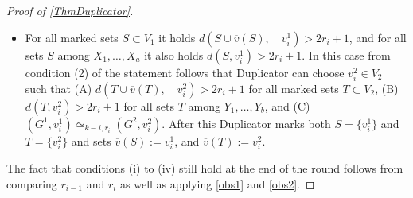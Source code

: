 \documentclass[12pt,notitlepage,a4paper]{article}
\theoremstyle{definition}
\begin{document}
\begin{proof}[Proof of \cref{ThmDuplicator}]
\begin{itemize}
\[		\quad
		N(\overline{z};3r_i+1), \overline{z}
		\, \big).		
		\]
		Then Duplicator can choose $v^2_i\in V_2$ according 
		to a winning strategy for this game. After this Duplicator
		marks both $S$ and $T$ and sets 
		$\overline{v}(S):=v^1_i$, and 
		$\overline{v}(T):=v^2_i$. Notice
		that because of \cref{lemm:Duplicator} now
		\[
		\big(G^1, (S,\overline{v}(S))\big)\simeq_{k-i,r_i}
		\big(G^2, (T,\overline{v}(T))\big).
		\]
		\item For all marked sets $S\subset V_1$ it holds
		$d(S\cup \overline{v}(S), \quad v^1_i)>2r_i +1$, and
		for all sets $S$ among $X_1,\dots, X_a$ it also holds
		$d(S,v^1_i)> 2r_i+1$. In this case
		from condition (2) of the statement follows that
		Duplicator can choose
		$v^2_i\in V_2$ such that
		(A)
		$d(T\cup \overline{v}(T),\quad v^2_i)>2r_i+1$ for all
		marked sets $T\subset V_2$, (B)
		$d(T, v^2_i)> 2r_i+1$ for all sets $T$ among
		$Y_1,\dots, Y_b$, and (C) 
		$(G^1,v^1_i)\simeq_{k-i,r_i} (G^2, v^2_i)$.
		After this Duplicator marks both $S=\{
		v^1_i\}$ and $T=\{v^2_i\}$ and sets
		$\overline{v}(S):=v^1_i$, and
		$\overline{v}(T):=v^2_i$. 		
	\end{itemize}	 
	The fact that conditions
	(i) to (iv) still hold at the end of the round
	follows from comparing $r_{i-1}$ and $r_{i}$ as well 
	as applying \cref{obs1} and \cref{obs2}.


\end{proof}
\end{document}
